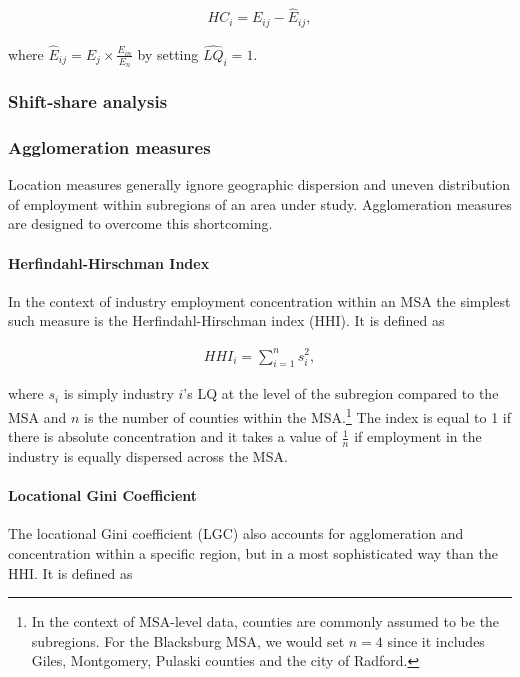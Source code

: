 \begin{eqnarray}
HC_{i} = E_{ij} - \widehat{E}_{ij},
\end{eqnarray}

\noindent where $\widehat{E}_{ij} = E_{j}\times \frac{E_{in}}{E_{n}}$ by setting $\widehat{LQ}_{i}=1$.

\subsubsection{Shift-share analysis}


\subsubsection{Agglomeration measures}
Location measures generally ignore geographic dispersion and uneven distribution of employment within subregions of an area under study.
Agglomeration measures are designed to overcome this shortcoming.

\paragraph{Herfindahl-Hirschman Index}
In the context of industry employment concentration within an MSA the simplest such measure is the Herfindahl-Hirschman index (HHI). It is defined as

\begin{eqnarray}
HHI_{i} = \sum^{n}_{i=1}s_{i}^{2},
\end{eqnarray}

\noindent where $s_{i}$ is simply industry $i$'s LQ at the level of the subregion compared to the MSA and $n$ is the number of counties
within the MSA.\footnote{In the context of MSA-level data, counties are commonly assumed to be the subregions. For the Blacksburg MSA,
we would set $n=4$ since it includes Giles, Montgomery, Pulaski counties and the city of Radford.} The index is equal to 1 if there is absolute concentration and it takes a value of $\frac{1}{n}$ if employment in the industry is equally dispersed across the MSA.

\paragraph{Locational Gini Coefficient}
The locational Gini coefficient (LGC) also accounts for agglomeration and concentration within a specific region, but in a most sophisticated way than the HHI. It is defined as

